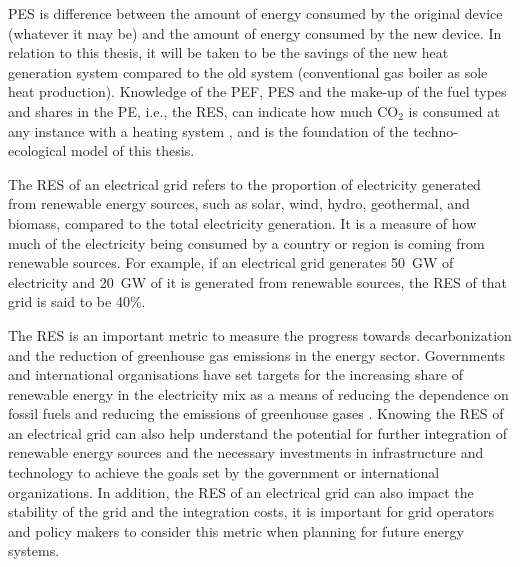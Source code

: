 \ac{PES} is difference between the amount of energy consumed by the original device (whatever it may be) and the amount of energy consumed by the new device. In relation to this thesis, it will be taken to be the savings of the new heat generation system compared to the old system (conventional gas boiler as sole heat production). Knowledge of the \ac{PEF}, \ac{PES} and the make-up of the fuel types and shares in the \ac{PE}, i.e., the \ac{RES}, can indicate how much $\text{CO}_2$ is consumed at any instance with a heating system \cite{bianco_estimation_2017}, and is the foundation of the techno-ecological model of this thesis. 

The \ac{RES} of an electrical grid refers to the proportion of electricity generated from renewable energy sources, such as solar, wind, hydro, geothermal, and biomass, compared to the total electricity generation. It is a measure of how much of the electricity being consumed by a country or region is coming from renewable sources. For example, if an electrical grid generates \qty{50}{\giga\watt} of electricity and \qty{20}{\giga\watt}  of it is generated from renewable sources, the \ac{RES} of that grid is said to be 40\%.

The \ac{RES} is an important metric to measure the progress towards decarbonization and the reduction of greenhouse gas emissions in the energy sector. Governments and international organisations have set targets for the increasing share of renewable energy in the electricity mix as a means of reducing the dependence on fossil fuels and reducing the emissions of greenhouse gases . Knowing the \ac{RES} of an electrical grid can also help understand the potential for further integration of renewable energy sources and the necessary investments in infrastructure and technology to achieve the goals set by the government or international organizations. In addition, the \ac{RES} of an electrical grid can also impact the stability of the grid and the integration costs, it is important for grid operators and policy makers to consider this metric when planning for future energy systems.


